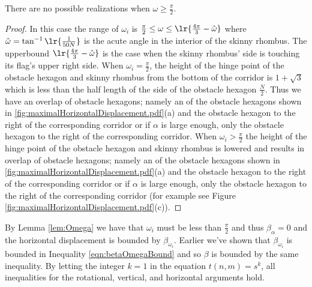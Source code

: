 \begin{lem}\label{lem:Omega}
There are no possible realizations when $\omega \geq \frac{\pi}{2}$.
\end{lem}
\begin{proof}
In this case the range of $\omega_i$ is $\frac{\pi}{2} \leq \omega \leq \lr{\frac{4 \pi}{3} - \hat{\omega}}$ where $\hat{\omega} = \tan^{-1} \lr{\frac{1}{50N}}$ is the acute angle in the interior of the skinny rhombus.  
The upperbound $\lr{\frac{4 \pi}{3} - \hat{\omega}}$ is the case when the skinny rhombus' side is touching its flag's upper right side.  
When $\omega_i = \frac{\pi}{2}$, the height of the hinge point of the obstacle hexagon and skinny rhombus from the bottom of the corridor is $1 + \sqrt{3}$ which is less than the half length of the side of the obstacle hexagon $\frac{N}{2}$.  
Thus we have an overlap of obstacle hexagons; namely an of the obstacle hexagons shown in \ref{fig:maximalHorizontalDisplacement.pdf}(a) and the obstacle hexagon to the right of the corresponding corridor or if $\alpha$ is large enough, only the obstacle hexagon to the right of the corresponding corridor.
When $\omega_i > \frac{\pi}{2}$ the height of the hinge point of the obstacle hexagon and skinny rhombus is lowered and results in overlap of obstacle hexagons; namely an of the obstacle hexagons shown in \ref{fig:maximalHorizontalDisplacement.pdf}(a) and the obstacle hexagon to the right of the corresponding corridor or if $\alpha$ is large enough, only the obstacle hexagon to the right of the corresponding corridor (for example see Figure \ref{fig:maximalHorizontalDisplacement.pdf}(c)).
\end{proof}

By Lemma \ref{lem:Omega} we have that $\omega_i$ must be less than $\frac{\pi}{2}$ and thus $\beta_\alpha = 0$ and the horizontal displacement is bounded by $\beta_{\omega_i}$.    
Earlier we've shown that $\beta_{\omega_i}$ is bounded in Inequality \ref{eqn:betaOmegaBound} and so $\beta$ is bounded by the same inequality.  
By letting the integer $k=1$ in the equation $t(n,m)=s^k$, all inequalities for the rotational, vertical, and horizontal arguments hold.



